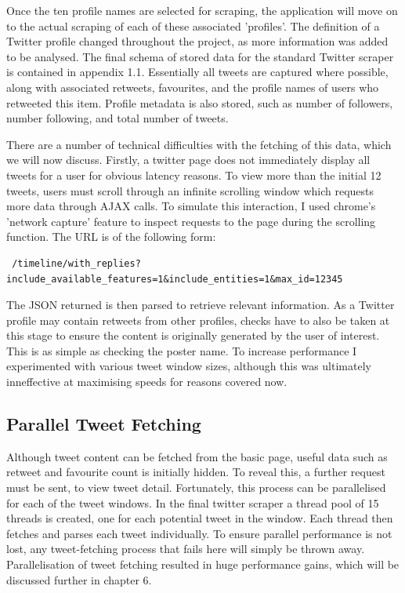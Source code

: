 Once the ten profile names are selected for scraping, the application will move on to the actual scraping of each of these associated 'profiles'. The definition of a Twitter profile changed throughout the project, as more information was added to be analysed. The final schema of stored data for the standard Twitter scraper is contained in appendix 1.1. Essentially all tweets are captured where possible, along with associated retweets, favourites, and the profile names of users who retweeted this item. Profile metadata is also stored, such as number of followers, number following, and total number of tweets.

There are a number of technical difficulties with the fetching of this data, which we will now discuss. Firstly, a twitter page does not immediately display all tweets for a user for obvious latency reasons. To view more than the initial 12 tweets, users must scroll through an infinite scrolling window which requests more data through AJAX calls. To simulate this interaction, I used chrome's 'network capture' feature to inspect requests to the page during the scrolling function. The URL is of the following form:

\begin{verbatim}
 /timeline/with_replies?include_available_features=1&include_entities=1&max_id=12345
\end{verbatim}

\noindent The JSON returned is then parsed to retrieve relevant information. As a Twitter profile may contain retweets from other profiles, checks have to also be taken at this stage to ensure the content is originally generated by the user of interest. This is as simple as checking the poster name. To increase performance I experimented with various tweet window sizes, although this was ultimately inneffective at maximising speeds for reasons covered now.

\subsection{Parallel Tweet Fetching}

Although tweet content can be fetched from the basic page, useful data such as retweet and favourite count is initially hidden. To reveal this, a further request must be sent, to view tweet detail. Fortunately, this process can be parallelised for each of the tweet windows. In the final twitter scraper a thread pool of 15 threads is created, one for each potential tweet in the window. Each thread then fetches and parses each tweet individually. To ensure parallel performance is not lost, any tweet-fetching process that fails here will simply be thrown away. Parallelisation of tweet fetching resulted in huge performance gains, which will be discussed further in chapter 6.

